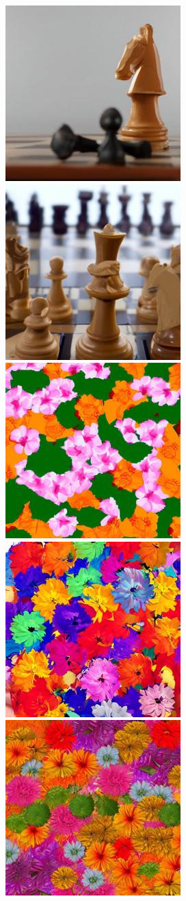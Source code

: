 \begin{figure}[h!]
\begin{subfigure}[t]{0.32\linewidth}
	\includegraphics[width=0.320\linewidth]{figs/samples_appendix_3/base_cfg_2_ode_prompt_75_image_2.jpg}\;%
	\includegraphics[width=0.320\linewidth]{figs/samples_appendix_3/base_cfg_2_ode_prompt_75_image_3.jpg}\\ 
	\includegraphics[width=0.320\linewidth]{figs/samples_appendix_3/base_cfg_2_ode_prompt_90_image_1.jpg}\;%
	\includegraphics[width=0.320\linewidth]{figs/samples_appendix_3/base_cfg_2_ode_prompt_90_image_2.jpg}\;%
	\includegraphics[width=0.320\linewidth]{figs/samples_appendix_3/base_cfg_2_ode_prompt_90_image_3.jpg}

\end{subfigure}
\end{figure}
